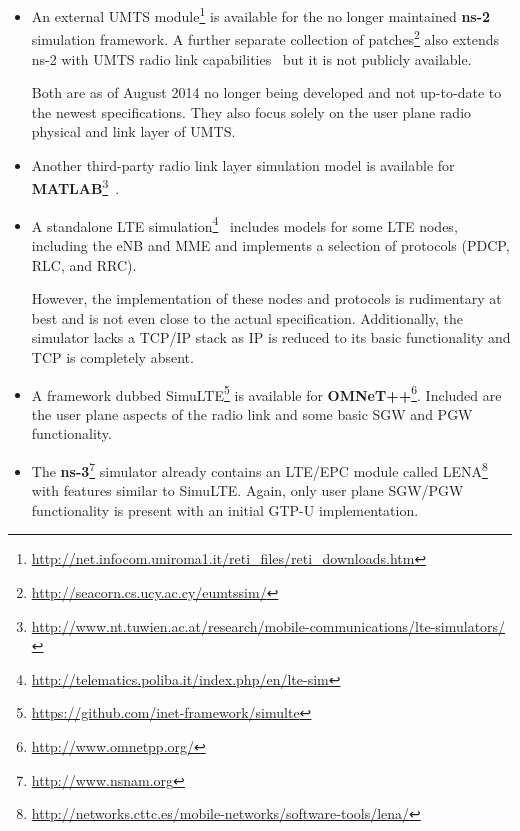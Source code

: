 \begin{itemize}
	\item An external \gls{UMTS} module\footnote{\url{http://net.infocom.uniroma1.it/reti_files/reti_downloads.htm}} is available for the no longer maintained \textbf{ns-2} simulation framework. A further separate collection of patches\footnote{\url{http://seacorn.cs.ucy.ac.cy/eumtssim/}} also extends ns-2 with \gls{UMTS} radio link capabilities~\cite{vranjevs2011use} but it is not publicly available.

	Both are as of August 2014 no longer being developed and not up-to-date to the newest specifications. They also focus solely on the user plane radio physical and link layer of \gls{UMTS}.

	\item Another third-party radio link layer simulation model is available for \textbf{MATLAB}\footnote{\url{http://www.nt.tuwien.ac.at/research/mobile-communications/lte-simulators/}}~\cite{mehlfuhrer2011vienna}.

	\item A standalone \gls{LTE} simulation\footnote{\url{http://telematics.poliba.it/index.php/en/lte-sim}}~\cite{5634134} includes models for some \gls{LTE} nodes, including the \gls{eNB} and \gls{MME} and implements a selection of protocols (\gls{PDCP}, \gls{RLC}, and \gls{RRC}).

	However, the implementation of these nodes and protocols is rudimentary at best and is not even close to the actual specification. Additionally, the simulator lacks a \gls{TCP}/\gls{IP} stack as \gls{IP} is reduced to its basic functionality and \gls{TCP} is completely absent.

	\item A framework dubbed SimuLTE\footnote{\url{https://github.com/inet-framework/simulte}} is available for \textbf{OMNeT++}\footnote{\url{http://www.omnetpp.org/}}. Included are the user plane aspects of the radio link and some basic \gls{SGW} and \gls{PGW} functionality.

	\item The \textbf{ns-3}\footnote{\url{http://www.nsnam.org}} simulator already contains an \gls{LTE}/\gls{EPC} module called LENA\footnote{\url{http://networks.cttc.es/mobile-networks/software-tools/lena/}}~\cite{Baldo:2013:OSM:2507924.2507940} with features similar to SimuLTE. Again, only user plane \gls{SGW}/\gls{PGW} functionality is present with an initial \gls{GTP-U} implementation.
\end{itemize}

